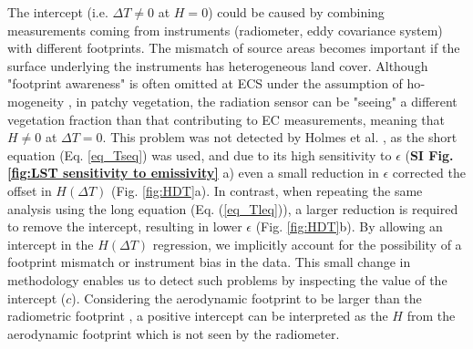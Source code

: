 \documentclass[fleqn,10pt]{wlscirep}
\begin{document}
{{The intercept (i.e. $\Delta T \ne 0$ at $H=0$) could be caused by combining measurements coming from instruments (radiometer, eddy covariance system) with different footprints\cite{marcolla2018geometry}. The mismatch of source areas becomes important if the surface underlying the instruments has heterogeneous land cover. 
 Although "footprint awareness" is often omitted at ECS under the assumption of ho­mogeneity \cite{chu2021representativeness}, in patchy vegetation, the radiation sensor can be "seeing" a different vegetation fraction than that contributing to EC measurements, meaning that $H\not= 0$ at $\Delta T=0$. This problem was not detected by Holmes et al. \cite{holmes_land_2009-1}, as the short equation (Eq. \ref{eq_Tseq}) was used, and due to its high sensitivity to $\epsilon$ (\textbf{SI Fig. \ref{fig:LST sensitivity to emissivity}} a) even a small reduction in $\epsilon$ corrected the offset in $H(\Delta T)$ (Fig. \ref{fig:HDT}a). In contrast, when repeating the same analysis using the long equation (Eq. (\ref{eq_Tleq})), a larger reduction is required to remove the intercept, resulting in lower $\epsilon$ (Fig. \ref{fig:HDT}b). By allowing an intercept in the $H(\Delta T)$ regression, we implicitly account for the possibility of a footprint mismatch or instrument bias in the data. This small change in methodology enables us to detect such problems by inspecting the value of the intercept ($c$). Considering  the aerodynamic footprint to be larger than the radiometric footprint \cite{marcolla2018geometry,chu2021representativeness}, a positive intercept can be interpreted as the $H$ from the aerodynamic footprint which is not seen by the radiometer.

}}
\end{document}
